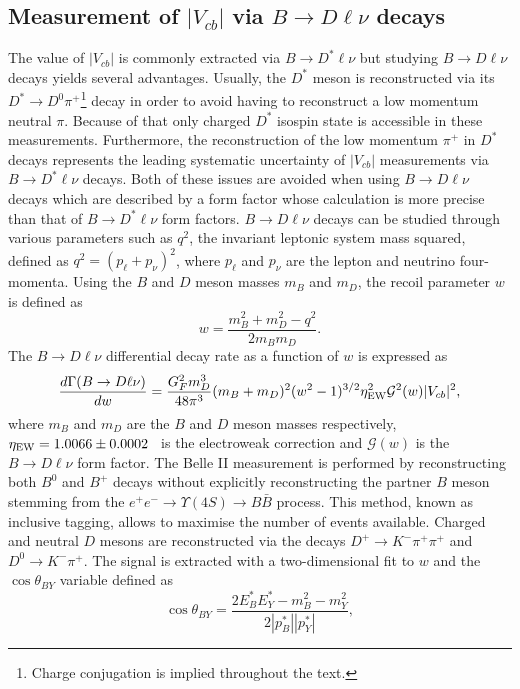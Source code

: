 \documentclass{moriond}
\def\vcb{V_{cb}}
\def\btodlnu{B \to D\ell\nu}
\def\btodstlnu{B \to D^*\ell\nu}
\def\costby{\cos\theta_{BY}}
\begin{document}
\subsection{Measurement of $|\vcb|$ via $\btodlnu$ decays}
The value of $|\vcb|$ is commonly extracted via $\btodstlnu$ but studying $\btodlnu$ decays yields several advantages. Usually, the $D^*$ meson is reconstructed via its $D^* \to D^0 \pi^+$\footnote{Charge conjugation is implied throughout the text.} decay in order to avoid having to reconstruct a low momentum neutral $\pi$. Because of that only charged $D^*$ isospin state is accessible in these measurements. Furthermore, the reconstruction of the low momentum $\pi^+$ in $D^*$ decays represents the leading systematic uncertainty of $|\vcb|$ measurements via $\btodstlnu$ decays. Both of these issues are avoided when using $\btodlnu$ decays which are described by a form factor whose calculation is more precise than that of $\btodstlnu$ form factors. $\btodlnu$ decays can be studied through various parameters such as $q^2$, the invariant leptonic system mass squared, defined as $q^2 = (p_\ell + p_\nu)^2$, where $p_\ell$ and $p_\nu$ are the lepton and neutrino four-momenta. Using the $B$ and $D$ meson masses $m_B$ and $m_D$, the recoil parameter $w$ is defined as
\begin{equation}
    w = \frac{m_B^2 + m_D^2 - q^2}{2m_Bm_D}.
\end{equation}
The $\btodlnu$ differential decay rate as a function of $w$ is expressed as~\cite{hqs}
\begin{equation}
    \frac{d\Gamma(\btodlnu)}{dw} = \frac{G_F^2m_D^3}{48\pi^3} (m_B+m_D)^2(w^2-1)^{3/2}\eta_{\rm EW}^2\mathcal{G}^2(w)|\vcb|^2,
\end{equation}
where $m_B$ and $m_D$ are the $B$ and $D$ meson masses respectively, $\eta_{\rm EW} = 1.0066 \pm 0.0002$~\cite{etaew} is the electroweak correction and $\mathcal{G}(w)$ is the $\btodlnu$ form factor. The Belle II measurement is performed by reconstructing both $B^0$ and $B^+$ decays without explicitly reconstructing the partner $B$ meson stemming from the $e^+e^- \to \Upsilon(4S) \to B\bar{B}$ process. This method, known as inclusive tagging, allows to maximise the number of events available. Charged and neutral $D$ mesons are reconstructed via the decays $D^+ \to K^- \pi^+ \pi^+$ and $D^0 \to K^- \pi^+$. The signal is extracted with a two-dimensional fit to $w$ and the $\costby$ variable defined as
\begin{equation}\label{equ:costby}
    \costby = \frac{2E^*_BE^*_Y-m_B^2-m_Y^2}{2|p_B^*||p_Y^*|},
\end{equation}
\end{document}
